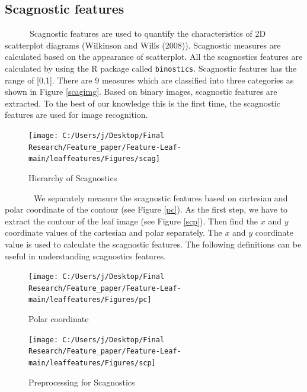 \documentclass{article}
\begin{document}
\hypertarget{scagnostic-features}{%
\subsection{Scagnostic features}\label{scagnostic-features}}

~~~~~~Scagnostic features are used to quantify the characteristics of 2D
scatterplot diagrams (Wilkinson and Wills (2008)). Scagnostic measures
are calculated based on the appearance of scatterplot. All the
scagnostics features are calculated by using the R package called
\texttt{binostics}. Scagnostic features has the range of {[}0,1{]}.
There are 9 measures which are classified into three categories as shown
in Figure \ref{scagimg}. Based on binary images, scagnostic features are
extracted. To the best of our knowledge this is the first time, the
scagnostic features are used for image recognition.

\begin{figure}[!ht]

{\centering \texttt{[image: C:/Users/j/Desktop/Final Research/Feature\_paper/Feature-Leaf-main/leaffeatures/Figures/scag]} 

}

\caption{\label{scagimg}Hierarchy of Scagnostics}\label{fig:unnamed-chunk-28}
\end{figure}

~~~~~~~We separately measure the scagnostic features based on cartesian
and polar coordinate of the contour (see Figure \ref{pc}). As the first
step, we have to extract the contour of the leaf image (see Figure
\ref{scp}). Then find the \(x\) and \(y\) coordinate values of the
cartesian and polar separately. The \(x\) and \(y\) coordinate value is
used to calculate the scagnostic features. The following definitions can
be useful in understanding scagnostics features.

\begin{figure}[!ht]

{\centering \texttt{[image: C:/Users/j/Desktop/Final Research/Feature\_paper/Feature-Leaf-main/leaffeatures/Figures/pc]} 

}

\caption{\label{pc}Polar coordinate}\label{fig:unnamed-chunk-29}
\end{figure}

\begin{figure}[!ht]

{\centering \texttt{[image: C:/Users/j/Desktop/Final Research/Feature\_paper/Feature-Leaf-main/leaffeatures/Figures/scp]} 

}

\caption{\label{scp}Preprocessing for Scagnostics}\label{fig:unnamed-chunk-30}
\end{figure}
\end{document}
